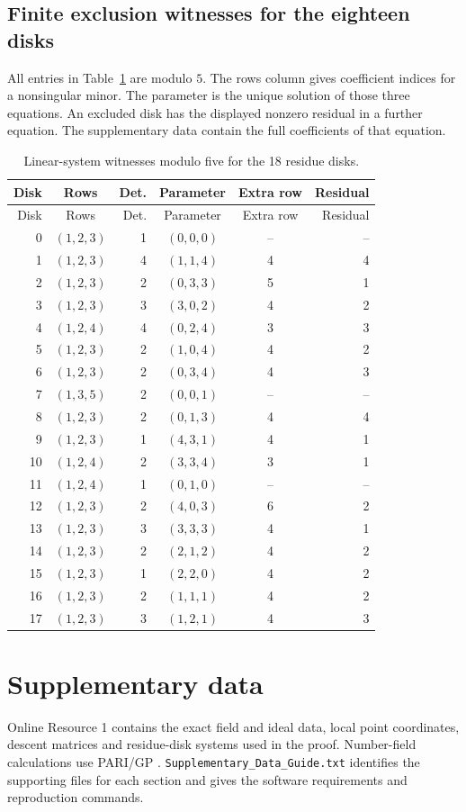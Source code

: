\documentclass[11pt,a4paper]{article}
\theoremstyle{definition}\newtheorem{definition}[theorem]{Definition}
\theoremstyle{remark}\newtheorem{remark}[theorem]{Remark}
\newcommand{\file}[1]{\texttt{\nolinkurl{#1}}}
\begin{document}
\subsection{Finite exclusion witnesses for the eighteen disks}\label{app:disks}
All entries in Table~\ref{tab:A-2} are modulo $5$. The rows column gives coefficient indices for a nonsingular minor. The parameter is the unique solution of those three equations. An excluded disk has the displayed nonzero residual in a further equation. The supplementary data contain the full coefficients of that equation.
\begingroup\small
\begin{longtable}{r c r c c r}
\caption{Linear-system witnesses modulo five for the 18 residue disks.}\label{tab:A-2}\\
\toprule Disk&Rows&Det.&Parameter&Extra row&Residual\\\midrule\endfirsthead
\toprule Disk&Rows&Det.&Parameter&Extra row&Residual\\\midrule\endhead
0&$(1,2,3)$&1&$(0,0,0)$&--&--\\
1&$(1,2,3)$&4&$(1,1,4)$&4&4\\
2&$(1,2,3)$&2&$(0,3,3)$&5&1\\
3&$(1,2,3)$&3&$(3,0,2)$&4&2\\
4&$(1,2,4)$&4&$(0,2,4)$&3&3\\
5&$(1,2,3)$&2&$(1,0,4)$&4&2\\
6&$(1,2,3)$&2&$(0,3,4)$&4&3\\
7&$(1,3,5)$&2&$(0,0,1)$&--&--\\
8&$(1,2,3)$&2&$(0,1,3)$&4&4\\
9&$(1,2,3)$&1&$(4,3,1)$&4&1\\
10&$(1,2,4)$&2&$(3,3,4)$&3&1\\
11&$(1,2,4)$&1&$(0,1,0)$&--&--\\
12&$(1,2,3)$&2&$(4,0,3)$&6&2\\
13&$(1,2,3)$&3&$(3,3,3)$&4&1\\
14&$(1,2,3)$&2&$(2,1,2)$&4&2\\
15&$(1,2,3)$&1&$(2,2,0)$&4&2\\
16&$(1,2,3)$&2&$(1,1,1)$&4&2\\
17&$(1,2,3)$&3&$(1,2,1)$&4&3\\
\bottomrule\end{longtable}\endgroup



\section*{Supplementary data}
Online Resource 1 contains the exact field and ideal data, local point coordinates, descent matrices and residue-disk systems used in the proof. Number-field calculations use PARI/GP \cite{PARI}. \file{Supplementary_Data_Guide.txt} identifies the supporting files for each section and gives the software requirements and reproduction commands.
\end{document}
